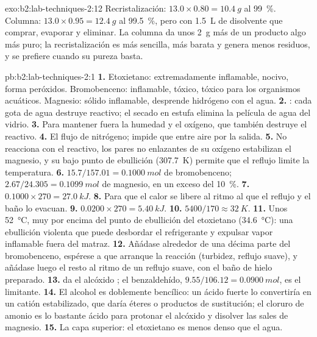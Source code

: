 \begin{solution}{exo:b2:lab-techniques-2:12}
Recristalización: $13.0 \times 0.80 = \qty{10.4}{g}$ al 99~\%. Columna: $13.0 \times 0.95 =
\qty{12.4}{g}$ al 99.5~\%, pero con \qty{1.5}{L} de disolvente que comprar, evaporar y eliminar. La columna da
unos \qty{2}{g} más de un producto algo más puro; la recristalización es más sencilla, más barata y genera menos
residuos, y se prefiere cuando su pureza basta.
\end{solution}

\begin{solution}{pb:b2:lab-techniques-2:1}
\textbf{1.} Etoxietano: extremadamente inflamable, nocivo, forma peróxidos. Bromobenceno: inflamable, tóxico,
tóxico para los organismos acuáticos. Magnesio: sólido inflamable, desprende hidrógeno con el agua.
\textbf{2.} : cada gota de agua destruye reactivo; el secado en estufa
elimina la película de agua del vidrio.
\textbf{3.} Para mantener fuera la humedad y el oxígeno, que también destruye el reactivo.
\textbf{4.} El flujo de nitrógeno; impide que entre aire por la salida.
\textbf{5.} No reacciona con el reactivo, los pares no enlazantes de su oxígeno estabilizan el magnesio, y su
bajo punto de ebullición (\qty{307.7}{K}) permite que el reflujo limite la temperatura.
\textbf{6.} $15.7/157.01 = \qty{0.1000}{mol}$ de bromobenceno; $2.67/24.305 = \qty{0.1099}{mol}$ de magnesio,
en un exceso del 10~\%.
\textbf{7.} $0.1000 \times 270 = \qty{27.0}{kJ}$.
\textbf{8.} Para que el calor se libere al ritmo al que el reflujo y el baño lo evacuan.
\textbf{9.} $0.0200 \times 270 = \qty{5.40}{kJ}$.
\textbf{10.} $5400/170 \approx \qty{32}{K}$.
\textbf{11.} Unos \qty{52}{\degreeCelsius}, muy por encima del punto de ebullición del etoxietano
(\qty{34.6}{\degreeCelsius}): una ebullición violenta que puede desbordar el refrigerante y expulsar vapor inflamable
fuera del matraz.
\textbf{12.} Añádase alrededor de una décima parte del bromobenceno, espérese a que arranque la reacción (turbidez, reflujo
suave), y añádase luego el resto al ritmo de un reflujo suave, con el baño de hielo preparado.
\textbf{13.}  da el alcóxido ; el benzaldehído,
$9.55/106.12 = \qty{0.0900}{mol}$, es el limitante.
\textbf{14.} El alcohol es doblemente bencílico: un ácido fuerte lo convertiría en un catión estabilizado,
que daría éteres o productos de sustitución; el cloruro de amonio es lo bastante ácido para protonar el alcóxido
y disolver las sales de magnesio.
\textbf{15.} La capa superior: el etoxietano es menos denso que el agua.

\end{solution}
